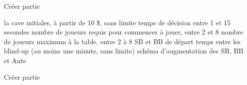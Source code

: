 \begin{usecase}{Créer partie}
\begin{regles}
		\begin{enumerate}
			\regle la cave initiales, à partir de 10 \$, sans limite
			\regle temps de décision entre 1 et 15 secondes
			\regle nombre de joueurs requis pour commencer à jouer, entre 2 et 8
			\regle nombre de joueurs maximum à la table, entre 2 à 8
			\regle SB et BB de départ
			\regle temps entre les blind-up (au moins une minute, sans limite)
			\regle schéma d'augmentation des SB, BB et Ante
		\end{enumerate}

	\end{regles}
	
	                {Créer partie}
	
\end{usecase}



